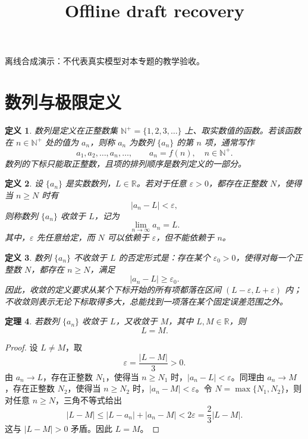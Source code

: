 \documentclass[UTF8,fontset=fandol,11pt]{ctexart}
\title{Offline draft recovery}
\date{}
\newtheorem{definition}{定义}[section]
\newtheorem{theorem}[definition]{定理}
\begin{document}
\maketitle
\par\noindent 离线合成演示：不代表真实模型对本专题的教学验收。\par
\section{数列与极限定义}\label{sec:S01}
\begin{definition}
\label{def:sequence}数列是定义在正整数集 $\mathbb{N}^{+}=\{1,2,3,\ldots\}$ 上、取实数值的函数。若该函数在 $n\in\mathbb{N}^{+}$ 处的值为 $a_n$，则称 $a_n$ 为数列 $\{a_n\}$ 的第 $n$ 项，通常写作
\[
a_1,a_2,\ldots,a_n,\ldots,
\qquad a_n=f(n),\quad n\in\mathbb{N}^{+}.
\]
数列的下标只能取正整数，且项的排列顺序是数列定义的一部分。
\end{definition}
\begin{definition}
\label{def:sequence-limit}\label{def:epsilon-N}设 $\{a_n\}$ 是实数数列，$L\in\mathbb{R}$。若对于任意 $\varepsilon>0$，都存在正整数 $N$，使得当 $n\geq N$ 时有
\[
|a_n-L|<\varepsilon,
\]
则称数列 $\{a_n\}$ 收敛于 $L$，记为
\[
\lim_{n\to\infty}a_n=L.
\]
其中，$\varepsilon$ 先任意给定，而 $N$ 可以依赖于 $\varepsilon$，但不能依赖于 $n$。
\end{definition}
\begin{definition}
数列 $\{a_n\}$ 不收敛于 $L$ 的否定形式是：存在某个 $\varepsilon_0>0$，使得对每一个正整数 $N$，都存在 $n\geq N$，满足
\[
|a_n-L|\geq\varepsilon_0.
\]
因此，收敛的定义要求从某个下标开始的所有项都落在区间 $(L-\varepsilon,L+\varepsilon)$ 内；不收敛则表示无论下标取得多大，总能找到一项落在某个固定误差范围之外。
\end{definition}
\begin{theorem}
\label{thm:limit-unique}若数列 $\{a_n\}$ 收敛于 $L$，又收敛于 $M$，其中 $L,M\in\mathbb{R}$，则
\[
L=M.
\]
\end{theorem}
\begin{proof}
设 $L\ne M$，取
\[
\varepsilon=\frac{|L-M|}{3}>0.
\]
由 $a_n\to L$，存在正整数 $N_1$，使得当 $n\geq N_1$ 时，$|a_n-L|<\varepsilon$。同理由 $a_n\to M$，存在正整数 $N_2$，使得当 $n\geq N_2$ 时，$|a_n-M|<\varepsilon$。令 $N=\max\{N_1,N_2\}$，则对任意 $n\geq N$，三角不等式给出
\[
|L-M|\leq |L-a_n|+|a_n-M|<2\varepsilon=\frac{2}{3}|L-M|.
\]
这与 $|L-M|>0$ 矛盾。因此 $L=M$。
\end{proof}
\end{document}
